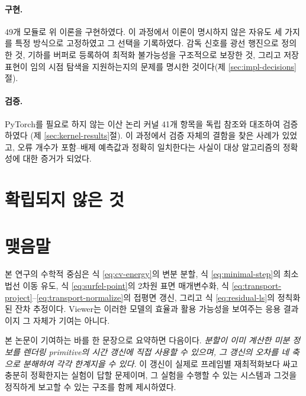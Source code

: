\paragraph{구현.}
49개 모듈로 위 이론을 구현하였다. 이 과정에서 이론이 명시하지 않은 자유도 세 가지를
특정 방식으로 고정하였고 그 선택을 기록하였다. 감독 신호를 광선 행진으로 정의한 것,
기하를 버퍼로 등록하여 최적화 불가능성을 구조적으로 보장한 것, 그리고 저장 표현이
임의 시점 탐색을 지원하는지의 문제를 명시한 것이다(제 \ref{sec:impl-decisions}절).

\paragraph{검증.}
PyTorch를 필요로 하지 않는 이산 논리 커널 41개 항목을 독립 참조와 대조하여 검증하였다
(제 \ref{sec:kernel-results}절). 이 과정에서 검증 자체의 결함을 찾은 사례가 있었고,
오류 개수가 포함--배제 예측값과 정확히 일치한다는 사실이 대상 알고리즘의 정확성에 대한
증거가 되었다.

\section{확립되지 않은 것}


\section{맺음말}

본 연구의 수학적 중심은 식 \eqref{eq:cv-energy}의 변분 분할, 식 \eqref{eq:minimal-step}의
최소법선 이동 유도, 식 \eqref{eq:surfel-point}의 2차원 표면 매개변수화, 식
\eqref{eq:transport-project}--\eqref{eq:transport-normalize}의 접평면 갱신, 그리고 식
\eqref{eq:residual-ls}의 정칙화된 잔차 추정이다. Viewer는 이러한 모델의 효율과 활용
가능성을 보여주는 응용 결과이지 그 자체가 기여는 아니다.

본 논문이 기여하는 바를 한 문장으로 요약하면 다음이다. \emph{분할이 이미 계산한 미분
정보를 렌더링 primitive의 시간 갱신에 직접 사용할 수 있으며, 그 갱신의 오차를 네 축으로
분해하여 각각 한계지을 수 있다.} 이 갱신이 실제로 프레임별 재최적화보다 싸고 충분히
정확한지는 실험이 답할 문제이며, 그 실험을 수행할 수 있는 시스템과 그것을 정직하게
보고할 수 있는 구조를 함께 제시하였다.
